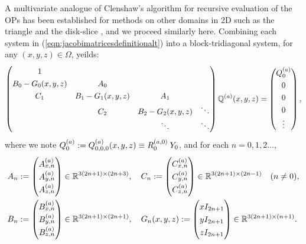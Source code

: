\documentclass[11pt, oneside]{article}   	%
\begin{document}
A multivariate analogue of Clenshaw's algorithm for recursive evaluation of the OPs has been established for methods on other domains in 2D such as the triangle \cite{olver2019triangle} and the disk-slice \cite{snowball2019sparse}, and we proceed similarly here. Combining each system in (\ref{eqn:jacobimatricesdefinitionalt}) into a block-tridiagonal system, for any $(x,y,z) \in \Omega$, yeilds:
\begin{align*}
	\renewcommand\arraystretch{1.3}
	\begin{pmatrix}
		1 & & & \\
		B_0-G_0(x,y,z) & A_0 & & \\
		C_1 & B_1-G_1(x,y,z) & \quad A_1 \quad & \\
		& C_2 & B_2 - G_2(x,y,z)  & \ddots \\
		& & \ddots &\ddots
	\end{pmatrix}
	\bigscopta(x,y,z) =
		\begin{pmatrix}
	 		\scopa_0 \\ 0 \\ 0 \\ 0 \\ \vdots  \\
		\end{pmatrix},
\end{align*}
where we note $Q^{(a)}_0 := Q^{(a)}_{0,0,0}(x,y,z) \equiv R_0^{(a,0)} \: Y_0$, and for each $n = 0,1,2\dots$,
\begin{align*}
	A_n &:= 
		\begin{pmatrix}
			A^{(a)}_{x,n} \\
			A^{(a)}_{y,n} \\
			A^{(a)}_{z,n}
		\end{pmatrix} \in \R^{3(2n+1)\times(2n+3)}, \quad
	C_n := 
		\begin{pmatrix}
			C^{(a)}_{x,n} \\
			C^{(a)}_{y,n} \\
			C^{(a)}_{z,n}
		\end{pmatrix} \in \R^{3(2n+1)\times(2n-1)} \quad (n \ne 0), \nonumber \\
	B_n &:= 
		\begin{pmatrix}
			B^{(a)}_{x,n} \\
			B^{(a)}_{y,n} \\
			B^{(a)}_{z,n}
		\end{pmatrix} \in \R^{3(2n+1)\times(2n+1)}, \quad
	G_n(x,y,z) := 
		\begin{pmatrix}
			xI_{2n+1} \\
			yI_{2n+1} \\
			zI_{2n+1}
		\end{pmatrix} \in \R^{3(2n+1)\times(n+1)}.
\end{align*}
 
\end{document}
